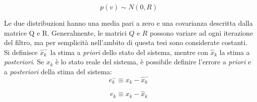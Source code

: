 \begin{equation}
p(v) \sim N(0,R)
\end{equation}

Le due distribuzioni hanno una media pari a zero e una covarianza descritta dalla matrice Q e R. Generalmente, le matrici $Q$ e $R$ possono variare ad ogni iterazione del filtro, ma per semplicità nell'ambito di questa tesi sono considerate costanti.\\
Si definisce $\hat{x}_k^-$ la stima a \textit{priori} dello stato del sistema, mentre con $\hat{x}_k$ la stima a \textit{posteriori}. Se $x_k$ è lo stato reale del sistema, è possibile definire l'errore a \textit{priori} e a \textit{posteriori} della stima del sistema:
\begin{equation}
e_k^- \equiv x_k - \hat{x}_k^-
\end{equation}

\begin{equation}
e_k \equiv x_k - \hat{x}_k
\end{equation}

